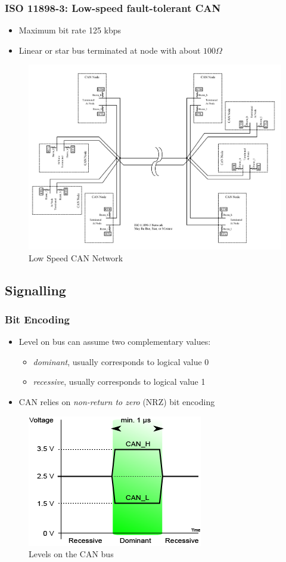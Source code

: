 \documentclass{beamer}
\begin{document}
\begin{frame}
	\frametitle{ISO 11898-3: Low-speed fault-tolerant CAN}
	\begin{itemize}
		\item Maximum bit rate 125 kbps
		\item Linear or star bus terminated at node with about $100 \Omega$
	\end{itemize}
	\begin{figure}
\includegraphics[width=.5\textwidth]{lowspeed.png} 
\caption{Low Speed CAN Network}%
\end{figure}
\end{frame}

\subsection{Signalling}
\begin{frame}
	\frametitle{Bit Encoding}
	\begin{itemize}
		\item Level on bus can assume two complementary values:
		\begin{itemize}
			\item \textit{dominant}, usually corresponds to logical value 0
			\item \textit{recessive}, usually corresponds to logical value 1
		\end{itemize}
		\item CAN relies on \emph{non-return to zero} (NRZ) bit encoding
	\end{itemize}
	\begin{figure}
	\includegraphics[width=.4\textwidth]{Canbus_levels.png} 
\caption{Levels on the CAN bus}%
\end{figure}
\end{frame}
\end{document}
